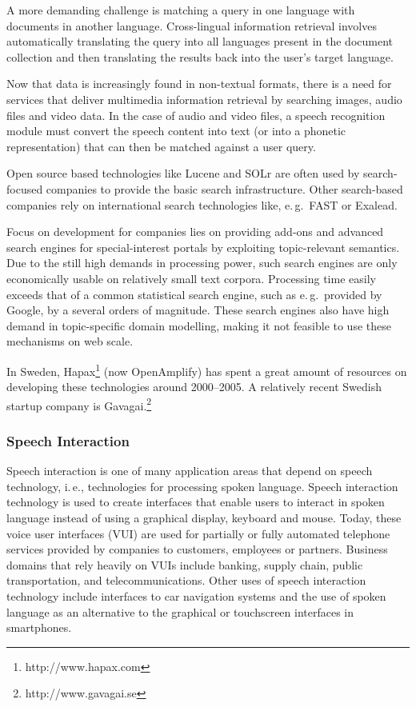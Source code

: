 \begin{multicols}{2}
A more demanding challenge is matching a query in one language with
documents in another language. Cross-lingual information retrieval
involves automatically translating the query into all languages
present in the document collection and then translating the results
back into the user's target language.

Now that data is increasingly found in non-textual formats, there is a need for services that deliver multimedia information retrieval by searching images, audio files and video data. In the case of audio and video files, a speech recognition module must convert the speech content into text (or into a phonetic representation) that can then be matched against a user query.

Open source based technologies like Lucene and SOLr are often used by search-focused companies to provide the basic search infrastructure. Other search-based companies rely on international search technologies like, e.\,g.~FAST or Exalead.

Focus on development for companies lies on providing add-ons and advanced search engines for special-interest portals by exploiting topic-relevant semantics. Due to the still high demands in processing power, such search engines are only economically usable on relatively small text corpora. Processing time easily exceeds that of a common statistical search engine, such as e.\,g.~provided by Google, by a several orders of magnitude. These search engines also have high demand in topic-specific domain modelling, making it not feasible to use these mechanisms on web scale. 

In Sweden, Hapax\footnote{http://www.hapax.com} (now OpenAmplify) has spent a great amount of resources on developing these technologies around 2000–2005. A relatively recent Swedish startup company is Gavagai.\footnote{http://www.gavagai.se}

\subsubsection{Speech Interaction}

Speech interaction is one of many application areas that depend on speech technology, i.\,e., technologies for processing spoken language. Speech interaction technology is used to create interfaces that enable users to interact in spoken language instead of using a graphical display, keyboard and mouse.  Today, these voice user interfaces (VUI) are used for partially or fully automated telephone services provided by companies to customers, employees or partners. Business domains that rely heavily on VUIs include banking, supply chain, public transportation, and telecommunications. Other uses of speech interaction technology include interfaces to car navigation systems and the use of spoken language as an alternative to the graphical or touchscreen interfaces in smartphones.


\end{multicols}
